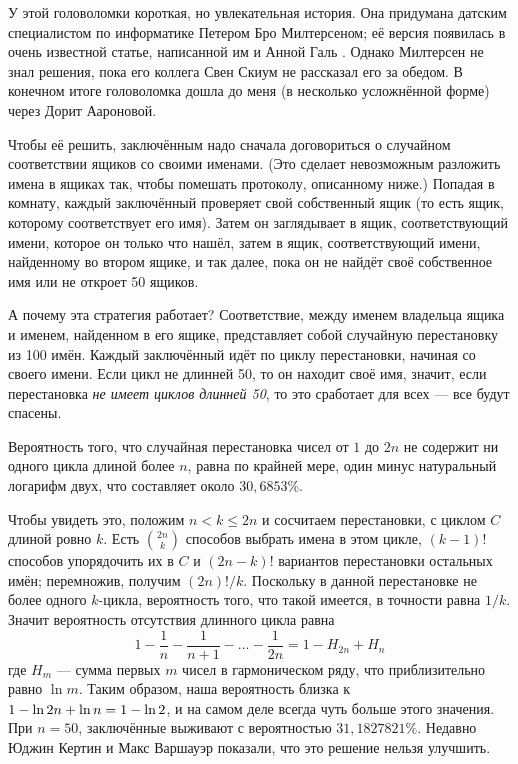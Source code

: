 У этой головоломки короткая, но увлекательная история.
Она придумана датским специалистом по информатике Петером Бро Милтерсеном;
её версия появилась в очень известной статье, написанной им и Анной Галь \cite{21}.
Однако Милтерсен не знал  решения, пока его коллега Свен Скиум не рассказал его за обедом.
В конечном итоге головоломка дошла до меня (в несколько усложнённой форме) через Дорит Аароновой.

Чтобы её решить, заключённым надо сначала договориться о случайном соответствии ящиков со своими именами.
(Это сделает невозможным разложить имена в ящиках так, чтобы помешать протоколу, описанному ниже.)
Попадая в комнату, каждый заключённый проверяет свой собственный ящик (то есть ящик, которому соответствует его имя).
Затем он заглядывает в ящик, соответствующий имени, которое он только что нашёл,
затем в ящик, соответствующий имени, найденному во втором ящике, и так далее, пока он не найдёт своё собственное имя или не откроет 50 ящиков.

А почему эта стратегия работает?
Соответствие, между именем владельца ящика и именем, найденном в его ящике, представляет собой случайную перестановку из 100 имён.
Каждый заключённый идёт по циклу перестановки, начиная со своего имени.
Если цикл не длинней 50, то он находит своё имя,
значит, если перестановка \emph{не имеет циклов длинней 50}, то это сработает для всех --- все будут спасены.

Вероятность того, что случайная перестановка чисел от $1$ до $2n$ не содержит ни одного цикла длиной более $n$, равна по крайней мере, один минус натуральный логарифм двух, что составляет около $30{,}6853\%$.

Чтобы увидеть это, положим $n < k \le 2n$ и сосчитаем перестановки, с циклом $C$ длиной ровно $k$.
Есть $\binom{2n}k$ способов выбрать имена в этом цикле, $(k - 1)!$ способов упорядочить их в $C$
и $(2n - k)!$ вариантов перестановки остальных имён;
перемножив, получим $(2n)!/k$.
Поскольку в данной перестановке не более одного $k$-цикла, вероятность того, что такой имеется, в точности равна $1/k$.
Значит вероятность отсутствия длинного цикла равна
\[1-\frac{1}{n}-\frac{1}{n+1}-\dots-\frac{1}{2n}=1-H_{2n}+H_n\]
где $H_m$ --- сумма первых $m$ чисел в гармоническом ряду, что приблизительно равно $\ln m$.
Таким образом, наша вероятность близка к $1 - \ln 2n \z+ \ln n = 1 - \ln 2$, и на самом деле всегда чуть больше этого значения.
При $n = 50$, заключённые выживают с вероятностью $31,1827821\%$.
Недавно Юджин Кертин и Макс Варшауэр \cite{13} показали, что это решение нельзя улучшить.


